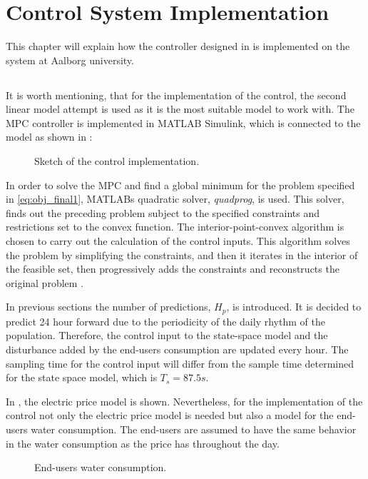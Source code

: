 \chapter{Control System Implementation}
\label{implementation_of_controller}

This chapter will explain how the controller designed in  is implemented on the system at Aalborg university.  

\section{}
It is worth mentioning, that for the implementation of the control, the second linear model attempt is used as it is the most suitable model to work with. The MPC controller is implemented in MATLAB Simulink, which is connected to the model as shown in :

\begin{figure}[H]
\centering
 
\caption{Sketch of the control implementation.}
\label{fig:control_sketch}
\end{figure}

In order to solve the MPC and find a global minimum for the problem specified in \eqref{eq:obj_final1},  MATLABs quadratic solver, \textit{quadprog}, is used. This solver, finds out the preceding problem subject to the specified constraints and restrictions set to the convex function. The interior-point-convex algorithm is chosen to carry out the calculation of the control inputs. This algorithm solves the problem by simplifying the constraints, and then it iterates in the interior of the feasible set, then progressively adds the constraints and reconstructs the original problem \cite{Convex_optimization}. 

In previous sections the number of predictions, $H_p$, is introduced. It is decided to predict 24 hour forward due to the periodicity of the daily rhythm of the population. Therefore, the control input to the state-space model and the disturbance added by the end-users consumption are updated every hour. The sampling time for the control input will differ from the sample time determined for the state space model, which is $T_s = 87.5s$. 

In , the electric price model is shown. Nevertheless, for the implementation of the control not only the electric price model is needed but also a model for the end-users water consumption. The end-users are assumed to have the same behavior in the water consumption as the price has throughout the day.

\begin{figure}[H]
\centering
 
\caption{End-users water consumption.}
\label{fig:water_consumption}
\end{figure}

